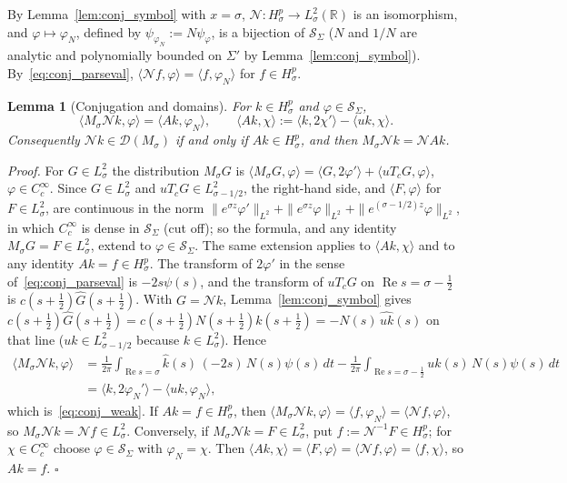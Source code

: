 \documentclass[11pt,a4paper]{article}
\newtheorem{lem}{Lemma}[section]
\begin{document}
\medskip
By Lemma~\ref{lem:conj_symbol} with $x=\sigma$, $\mathcal{N}:H^p_\sigma\to L^2_\sigma(\mathbb{R})$ is an isomorphism, and
$\varphi\mapsto\varphi_N$, defined by $\psi_{\varphi_N}:=N\psi_\varphi$, is a bijection of $\mathcal{S}_\Sigma$ ($N$ and $1/N$ are
analytic and polynomially bounded on $\Sigma'$ by Lemma~\ref{lem:conj_symbol}).  By~\eqref{eq:conj_parseval}, $\langle\mathcal{N}f,\varphi\rangle=\langle f,\varphi_N\rangle$
for $f\in H^p_\sigma$.

\begin{lem}[Conjugation and domains]\label{lem:conj_domain}
For $k\in H^p_\sigma$ and $\varphi\in\mathcal{S}_\Sigma$,
\begin{equation}\label{eq:conj_weak}
\langle M_\sigma\mathcal{N}k,\varphi\rangle=\langle Ak,\varphi_N\rangle,\qquad
\langle Ak,\chi\rangle:=\langle k,2\chi'\rangle-\langle uk,\chi\rangle .
\end{equation}
Consequently $\mathcal{N}k\in\mathcal{D}(M_\sigma)$ if and only if $Ak\in H^p_\sigma$, and then $M_\sigma\mathcal{N}k=\mathcal{N}Ak$.
\end{lem}
\textit{Proof.}
For $G\in L^2_\sigma$ the distribution $M_\sigma G$ is $\langle M_\sigma G,\varphi\rangle=\langle G,2\varphi'\rangle+\langle uT_cG,\varphi\rangle$,
$\varphi\in C_c^\infty$.  Since $G\in L^2_\sigma$ and $uT_cG\in L^2_{\sigma-1/2}$, the right-hand side, and $\langle F,\varphi\rangle$ for $F\in L^2_\sigma$, are continuous in the norm
$\|e^{\sigma z}\varphi'\|_{L^2}+\|e^{\sigma z}\varphi\|_{L^2}+\|e^{(\sigma-1/2)z}\varphi\|_{L^2}$, in which $C_c^\infty$ is dense in
$\mathcal{S}_\Sigma$ (cut off);
so the formula, and any identity $M_\sigma G=F\in L^2_\sigma$, extend to $\varphi\in\mathcal{S}_\Sigma$.  The same extension applies to
$\langle Ak,\chi\rangle$ and to any identity $Ak=f\in H^p_\sigma$.  The transform of
$2\varphi'$ in the sense of~\eqref{eq:conj_parseval} is $-2s\psi(s)$, and the transform of $uT_cG$ on $\operatorname{Re}s=\sigma-\tfrac12$ is
$c(s+\tfrac12)\widehat{G}(s+\tfrac12)$.  With $G=\mathcal{N}k$, Lemma~\ref{lem:conj_symbol} gives
$c(s+\tfrac12)\widehat{G}(s+\tfrac12)=c(s+\tfrac12)N(s+\tfrac12)\widehat{k}(s+\tfrac12)=-N(s)\,\widehat{uk}(s)$ on that line
($uk\in L^2_{\sigma-1/2}$ because $k\in L^2_\sigma$).  Hence
\begin{align*}
\langle M_\sigma\mathcal{N}k,\varphi\rangle
&=\frac{1}{2\pi}\!\int_{\operatorname{Re}s=\sigma}\!\widehat{k}(s)\,(-2s)\,N(s)\psi(s)\,dt
-\frac{1}{2\pi}\!\int_{\operatorname{Re}s=\sigma-\frac12}\!\widehat{uk}(s)\,N(s)\psi(s)\,dt\\
&=\langle k,2\varphi_N'\rangle-\langle uk,\varphi_N\rangle ,
\end{align*}
which is~\eqref{eq:conj_weak}.
If $Ak=f\in H^p_\sigma$, then $\langle M_\sigma\mathcal{N}k,\varphi\rangle=\langle f,\varphi_N\rangle=\langle\mathcal{N}f,\varphi\rangle$, so
$M_\sigma\mathcal{N}k=\mathcal{N}f\in L^2_\sigma$.  Conversely, if $M_\sigma\mathcal{N}k=F\in L^2_\sigma$, put $f:=\mathcal{N}^{-1}F\in H^p_\sigma$;
for $\chi\in C_c^\infty$ choose $\varphi\in\mathcal{S}_\Sigma$ with $\varphi_N=\chi$.  Then
$\langle Ak,\chi\rangle=\langle F,\varphi\rangle=\langle\mathcal{N}f,\varphi\rangle=\langle f,\chi\rangle$, so $Ak=f$. \hfill$\square$
\end{document}
